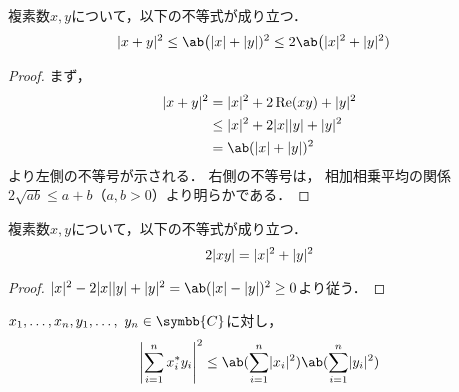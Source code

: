 \documentclass[../sotsu.tex]{subfiles}
\begin{document}
\begin{proposition}
    \label{thm:complex-abs-squared-inequality}
    複素数$x, y$について，以下の不等式が成り立つ．
    \begin{align}
        \label{eq:complex-abs-squared-inequality}
        \abs{x + y}^2 
            &\leq \ab\big( \abs{x} + \abs{y} )^2 
            \leq 2\ab\big( \abs{x}^2 + \abs{y}^2 )
    \end{align}
\end{proposition}

\begin{proof}
    まず，
    \begin{equation*}
        \begin{split}
            \abs{x + y}^2
                &= \abs{x}^2 + 2\Real (xy) + \abs{y}^2    \\
                &\leq \abs{x}^2 + 2 \abs{x} \abs{y} + \abs{y}^2  \\
                &= \ab( \abs{x} + \abs{y} )^2
        \end{split}
    \end{equation*}
    より左側の不等号が示される．
    右側の不等号は，
    相加相乗平均の関係$2\sqrt{ab} \leq a + b$（$a, b > 0$）より明らかである．
\end{proof}


\begin{corollary}
    \label{thm:complex-abs-product-inequality}
    複素数$x, y$について，以下の不等式が成り立つ．
    \begin{equation}
        \label{eq:complex-abs-product-inequality}
        2\lvert xy\rvert = \lvert x\rvert^2 + \lvert y\rvert^2
    \end{equation}
\end{corollary}

\begin{proof}
    \(
        \abs{x}^2 -2 \abs{x} \abs{y} + \abs{y}^2
            = \ab( \abs{x} - \abs{y} )^2
            \geq 0
    \)より従う．
\end{proof}


\begin{theorem}
    \label{thm:Euclidean-Cauchy-Schwarz}
    $x_1, \dots, x_n, y_1, \dots, \  y_n \in \symbb{C}$に対し，
    \begin{equation}
        \label{eq:Euclidean-Cauchy-Schwarz}
        \abs*{ \sum_{i=1}^{n} \conj{x_i} y_i }^2
        \leq \ab( \sum_{i=1}^{n} \abs{x_i}^2 )
             \ab( \sum_{i=1}^{n} \abs{y_i}^2 )
    \end{equation}
\end{theorem}
\end{document}
